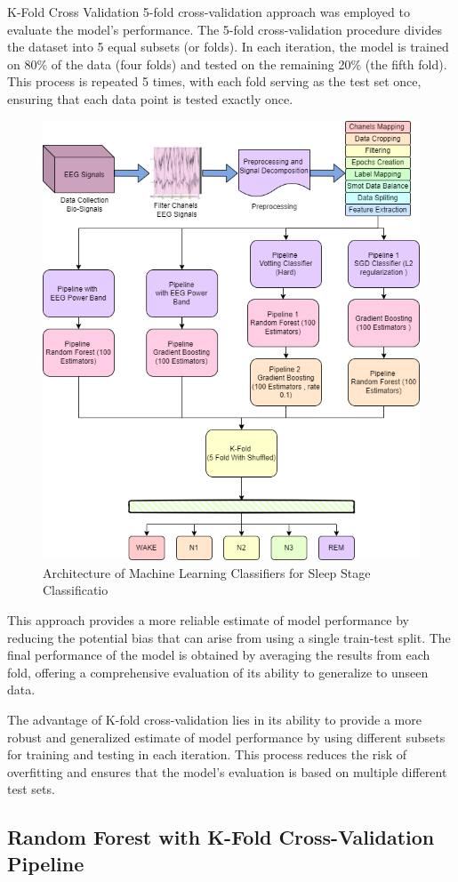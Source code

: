 K-Fold Cross Validation  5-fold cross-validation approach was employed to evaluate the model's performance. The 5-fold cross-validation procedure divides the dataset into 5 equal subsets (or folds). In each iteration, the model is trained on 80\% of the data (four folds) and tested on the remaining 20\% (the fifth fold). This process is repeated 5 times, with each fold serving as the test set once, ensuring that each data point is tested exactly once.

\begin{figure}[H]
	\centering
	\includegraphics[width=0.6\linewidth]{"img/paper_1/k-FOLD.PNG"}
	\caption{Architecture of Machine Learning Classifiers for Sleep Stage
		Classificatio}
	\label{fig:architechture1}
\end{figure}



This approach provides a more reliable estimate of model performance by reducing the potential bias that can arise from using a single train-test split. The final performance of the model is obtained by averaging the results from each fold, offering a comprehensive evaluation of its ability to generalize to unseen data.

The advantage of K-fold cross-validation lies in its ability to provide a more robust and generalized estimate of model performance by using different subsets for training and testing in each iteration. This process reduces the risk of overfitting and ensures that the model's evaluation is based on multiple different test sets.

\subsection{Random Forest with K-Fold Cross-Validation Pipeline}

